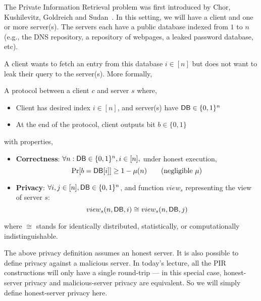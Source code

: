 
The Private Information Retrieval problem was first introduced by Chor, Kushilevitz, Goldreich and Sudan~\cite{chor1998private}.
In this setting, we will have a client and 
one or more server(s). The servers each have a public database indexed from $1$ to $n$ (e.g., the DNS repository, 
a repository of webpages, a leaked password database, etc).

A client wants to fetch an entry from this database $i \in [n]$ but does not want to leak their query to the server(s). More formally,
\begin{definition}
A protocol between a client $c$ and server $s$ where,
\begin{itemize}
	\item Client has desired index $i \in [n]$, and server(s) have ${\sf DB} \in \{0,1\}^n$
	\item At the end of the protocol, client outputs bit $b \in \{0,1\}$
\end{itemize}
with properties,
\begin{itemize}

	\item \textbf{Correctness}: $\forall n: {\sf DB} \in \{0,1\}^n, i \in [n],$ under honest execution, 
	\[\Pr[b = {\sf DB}[i]] \geq 1 - \mu(n) \tag{negligible $\mu$}\]
	
	\item \textbf{Privacy}: $\forall i,j \in [n], {\sf DB}  \in \{0,1\}^n$, and function $view_{s}$ representing the view of server $s$:
	\[view_s(n,{\sf DB},i) \cong view_s(n,{\sf DB},j)\]
\end{itemize}
where $\cong$ stands for identically distributed, statistically, 
or computationally indistinguishable.
\end{definition}

\begin{remark}
The above privacy definition assumes an honest server.
It is also possible to define privacy against a malicious server.
In today's lecture, all the PIR constructions
will only have a single round-trip --- 
in this special case, honest-server privacy
and malicious-server
privacy are equivalent. So we will simply define honest-server privacy here.
\end{remark}



